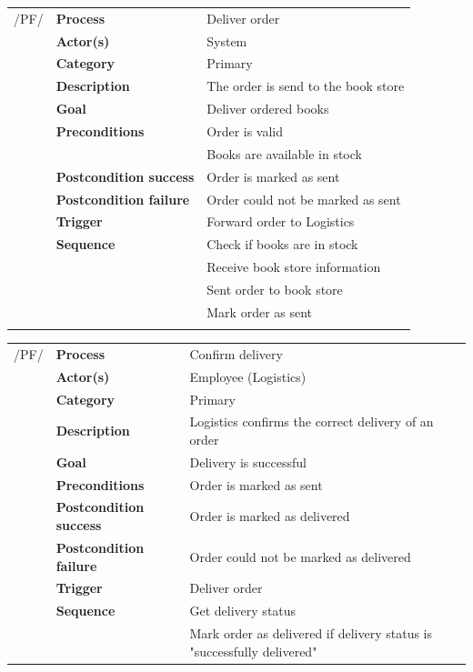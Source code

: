 \documentclass[11pt,a4paper,oneside,svgnames]{report}
\begin{document}
\noindent
\begin{tabular}{p{1.5cm}p{3cm}p{8cm}}
/PF/	& \textbf{Process} & Deliver order\\
		& \textbf{Actor(s)} & System\\
		& \textbf{Category} & Primary\\
		& \textbf{Description}	 &  The order is send to the book store\\
		& \textbf{Goal} & Deliver ordered books\\
		& \textbf{Preconditions} & Order is valid\\
		& & Books are available in stock\\
		& \textbf{Postcondition success} & Order is marked as sent\\
		& \textbf{Postcondition failure} & Order could not be marked as sent\\
		& \textbf{Trigger} & Forward order to Logistics\\
		& \textbf{Sequence} & Check if books are in stock\\
		& & Receive book store information\\
		& & Sent order to book store\\
		& & Mark order as sent\\
		
\hfill \\
\end{tabular}

\noindent
\begin{tabular}{p{1.5cm}p{3cm}p{8cm}}
/PF/	& \textbf{Process} & Confirm delivery\\
		& \textbf{Actor(s)} & Employee (Logistics)\\
		& \textbf{Category} & Primary\\
		& \textbf{Description}	 & Logistics confirms the correct delivery of an order\\
		& \textbf{Goal} & Delivery is successful\\
		& \textbf{Preconditions} & Order is marked as sent\\
		& \textbf{Postcondition success} & Order is marked as delivered\\
		& \textbf{Postcondition failure} & Order could not be marked as delivered\\
		& \textbf{Trigger} & Deliver order\\
		& \textbf{Sequence} & Get delivery status\\
		& & Mark order as delivered if delivery status is "successfully delivered"
		
\hfill \\
\end{tabular}
\end{document}
